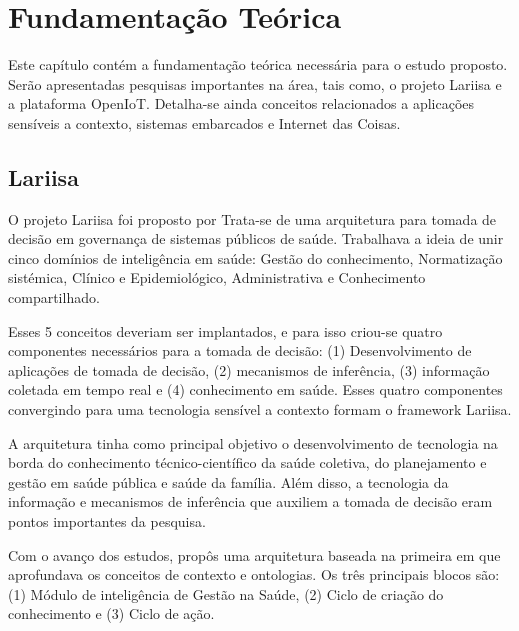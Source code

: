 \chapter{Fundamentação Teórica}\label{cap:fundamentacao-teorica}

Este capítulo contém a fundamentação teórica necessária para o estudo
proposto. Serão apresentadas pesquisas importantes na área, tais como, o
projeto Lariisa e a plataforma OpenIoT. Detalha-se ainda conceitos relacionados 
a aplicações sensíveis a contexto, sistemas embarcados e Internet das Coisas.

\section{Lariisa}\label{sec:lariisa}

O projeto Lariisa foi proposto por 
Trata-se de uma arquitetura para tomada de decisão em governança de sistemas
públicos de saúde. Trabalhava a ideia de unir cinco domínios de inteligência em
saúde: Gestão do conhecimento, Normatização sistémica,  Clínico e
Epidemiológico, Administrativa e Conhecimento compartilhado.

Esses 5 conceitos deveriam ser implantados, e para isso criou-se quatro
componentes necessários para a tomada de decisão: (1) Desenvolvimento de
aplicações de tomada de decisão, (2) mecanismos de inferência, (3) informação
coletada em tempo real e (4) conhecimento em saúde. Esses quatro componentes
convergindo para uma tecnologia sensível a contexto formam o framework Lariisa.


A arquitetura tinha como principal objetivo o desenvolvimento de tecnologia na
borda do conhecimento técnico-científico da saúde coletiva, do planejamento e
gestão em saúde pública e saúde da família. Além disso, a tecnologia da
informação e mecanismos de inferência que auxiliem a tomada de decisão eram
pontos importantes da pesquisa.

Com o avanço dos estudos,  propôs uma
arquitetura baseada na primeira em que aprofundava os conceitos de contexto e
ontologias. Os três principais blocos são: (1) Módulo de inteligência de Gestão
na Saúde, (2) Ciclo de criação do conhecimento e (3) Ciclo de ação.

